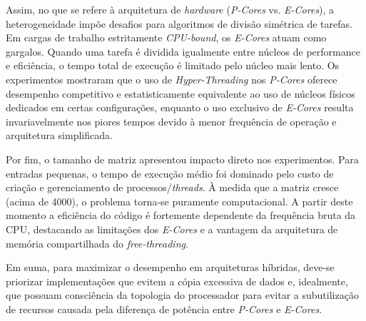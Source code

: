 \documentclass[acmsmall]{acmart}
\begin{document}
Assim, no que se refere à arquitetura de \textit{hardware} (\textit{P-Cores} vs. \textit{E-Cores}), a heterogeneidade impõe desafios para algoritmos de divisão simétrica de tarefas. Em cargas de trabalho estritamente \textit{CPU-bound}, os \textit{E-Cores} atuam como gargalos. Quando uma tarefa é dividida igualmente entre núcleos de performance e eficiência, o tempo total de execução é limitado pelo núcleo mais lento. Os experimentos mostraram que o uso de \textit{Hyper-Threading} nos \textit{P-Cores} oferece desempenho competitivo e estatisticamente equivalente ao uso de núcleos físicos dedicados em certas configurações, enquanto o uso exclusivo de \textit{E-Cores} resulta invariavelmente nos piores tempos devido à menor frequência de operação e arquitetura simplificada.

Por fim, o tamanho de matriz apresentou impacto direto nos experimentos. Para entradas pequenas, o tempo de execução médio foi dominado pelo custo de criação e gerenciamento de processos/\textit{threads}. À medida que a matriz cresce (acima de 4000), o problema torna-se puramente computacional. A partir deste momento a eficiência do código é fortemente dependente da frequência bruta da CPU, destacando as limitações dos \textit{E-Cores} e a vantagem da arquitetura de memória compartilhada do \textit{free-threading}.

Em suma, para maximizar o desempenho em arquiteturas híbridas, deve-se priorizar implementações que evitem a cópia excessiva de dados e, idealmente, que possuam consciência da topologia do processador para evitar a subutilização de recursos causada pela diferença de potência entre \textit{P-Cores} e \textit{E-Cores}.




\end{document}
